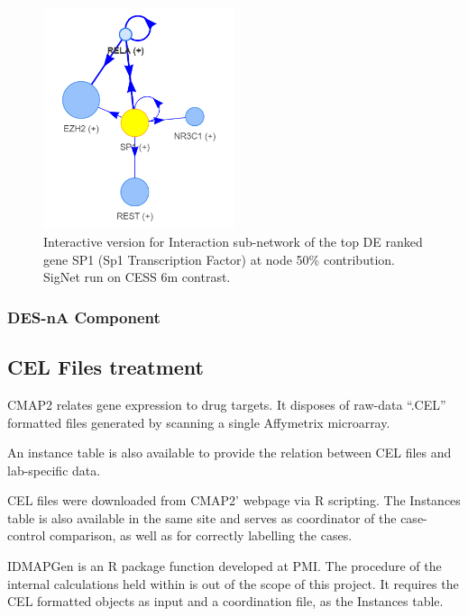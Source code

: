 \begin{figure}[!htbp]
    \centering
    \includegraphics[width=0.5\textwidth, height=\textheight, keepaspectratio]{Major Thesis/figures/iut/graph/iCESS6m50-SP1.png}
    \caption{Interactive version for Interaction sub-network of the top DE ranked gene SP1 (Sp1 Transcription Factor) at node 50\% contribution. SigNet run on CESS 6m contrast.}
    \label{section:suppl:results:cess-interactive}
\end{figure}

\subsubsection{DES-nA Component}


\FloatBarrier

\subsection{CEL Files treatment}
CMAP2 \cite{Subramanian2017AProfiles} relates gene expression to drug targets. It disposes of raw-data “.CEL” formatted files generated by scanning a single Affymetrix microarray.

An instance table is also available to provide the relation between CEL files and lab-specific data.

CEL files were downloaded from CMAP2’ webpage via R scripting. The Instances table is also available in the same site and serves as coordinator of the case-control comparison, as well as for correctly labelling the cases.

IDMAPGen is an R package function developed at PMI. The procedure of the internal calculations held within is out of the scope of this project. It requires the CEL formatted objects as input and a coordination file, as the Instances table.

